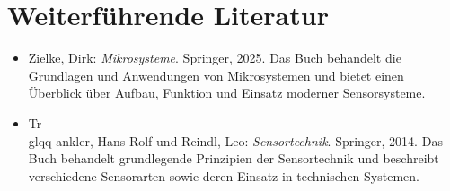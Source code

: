 \section{Weiterführende Literatur}
\begin{itemize}
	\item Zielke, Dirk: \textsl{Mikrosysteme}. Springer, 2025. \cite{zielke:2025}  
	Das Buch behandelt die Grundlagen und Anwendungen von Mikrosystemen und bietet einen Überblick über Aufbau, Funktion und Einsatz moderner Sensorsysteme.
	
	\item Tr{\\glqq a}nkler, Hans-Rolf und Reindl, Leo: \textsl{Sensortechnik}. Springer, 2014. \cite{traenkler:2014}  
	Das Buch behandelt grundlegende Prinzipien der Sensortechnik und beschreibt verschiedene Sensorarten sowie deren Einsatz in technischen Systemen.
\end{itemize}